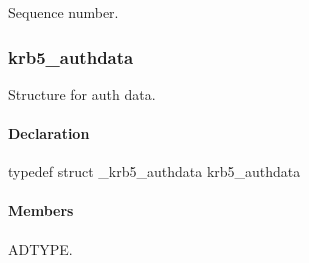 \documentclass[letterpaper,10pt,english]{sphinxmanual}
\begin{document}

\begin{fulllineitems}
\label{appdev/refs/types/krb5_ap_rep_enc_part:krb5_ap_rep_enc_part.seq_number}
Sequence number.

\end{fulllineitems}



\subsubsection{krb5\_authdata}
\label{appdev/refs/types/krb5_authdata:krb5-authdata}\label{appdev/refs/types/krb5_authdata::doc}\label{appdev/refs/types/krb5_authdata:krb5-authdata-struct}

\begin{fulllineitems}
\label{appdev/refs/types/krb5_authdata:krb5_authdata}
\end{fulllineitems}


Structure for auth data.


\paragraph{Declaration}
\label{appdev/refs/types/krb5_authdata:declaration}
typedef struct \_krb5\_authdata  krb5\_authdata


\paragraph{Members}
\label{appdev/refs/types/krb5_authdata:members}

\begin{fulllineitems}
\label{appdev/refs/types/krb5_authdata:krb5_authdata.magic}
\end{fulllineitems}


\begin{fulllineitems}
\label{appdev/refs/types/krb5_authdata:krb5_authdata.ad_type}
ADTYPE.

\end{fulllineitems}
\end{document}
